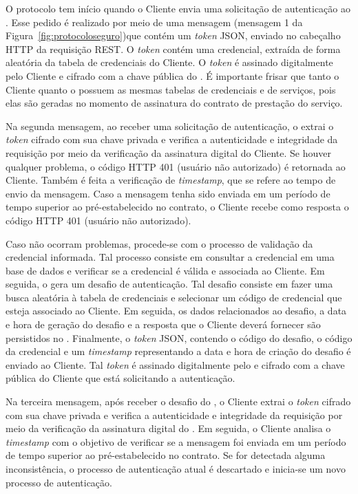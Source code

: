 O protocolo tem início quando o Cliente envia uma solicitação de autenticação ao \servidorAA.
Esse pedido é realizado por meio de uma mensagem (mensagem 1 da Figura~\ref{fig:protocoloseguro})que contém um \emph{token} JSON, enviado no cabeçalho HTTP da requisição REST. O \emph{token} contém uma credencial, extraída de forma aleatória da tabela de credenciais do Cliente. O \emph{token} é assinado digitalmente pelo Cliente e cifrado com a chave pública do \servidorAA. É importante frisar que tanto o Cliente quanto o \servidorAA{} possuem as mesmas tabelas de credenciais e de serviços, pois elas são geradas no momento de assinatura do contrato de prestação do serviço.

Na segunda mensagem, ao receber uma solicitação de autenticação, o \servidorAA{} extrai o \emph{token} cifrado com sua chave privada e verifica a autenticidade e integridade da requisição por meio da verificação da assinatura digital do Cliente. Se houver qualquer problema, o código HTTP 401 (usuário não autorizado) é retornada ao Cliente.
Também é feita a verificação de \emph{timestamp}, que se refere ao tempo de envio da mensagem. Caso a mensagem tenha
sido enviada em um período de tempo superior ao pré-estabelecido no contrato, o Cliente recebe como resposta o código HTTP 401 (usuário não autorizado).

Caso não ocorram problemas, procede-se com o processo de validação da credencial informada. Tal processo consiste em
consultar a credencial em uma base de dados e verificar se a credencial é válida e associada ao Cliente. Em seguida, o \servidorAA{} gera um desafio de autenticação. Tal desafio consiste em fazer uma busca aleatória à tabela de credenciais e selecionar um código de credencial que esteja associado ao Cliente. Em seguida, os dados relacionados ao desafio, a data e hora de geração do desafio e a resposta que o Cliente deverá fornecer são persistidos no \servidorBD. Finalmente, o \emph{token} JSON, contendo o código do desafio, o código da credencial e um \emph{timestamp} representando a data e hora de criação do desafio é enviado ao Cliente. Tal \emph{token} é assinado digitalmente pelo \servidorAA{} e cifrado com a chave pública do Cliente que está solicitando a autenticação.

Na terceira mensagem, após receber o desafio do \servidorAA, o Cliente extrai o \emph{token} cifrado com sua chave
privada e verifica a autenticidade e integridade da requisição por meio da verificação da assinatura digital do \servidorAA.
Em seguida, o Cliente analisa o \emph{timestamp} com o objetivo de verificar se a mensagem foi enviada em um período de tempo superior ao pré-estabelecido no contrato. Se for detectada alguma inconsistência, o processo de autenticação atual é descartado e inicia-se um novo processo de autenticação.

